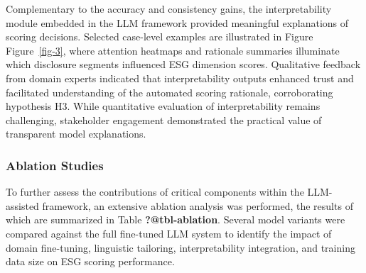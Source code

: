 \documentclass[
  12pt,
]{article}
\begin{document}
Complementary to the accuracy and consistency gains, the
interpretability module embedded in the LLM framework provided
meaningful explanations of scoring decisions. Selected case-level
examples are illustrated in Figure Figure~\ref{fig-3}, where attention
heatmaps and rationale summaries illuminate which disclosure segments
influenced ESG dimension scores. Qualitative feedback from domain
experts indicated that interpretability outputs enhanced trust and
facilitated understanding of the automated scoring rationale,
corroborating hypothesis H3. While quantitative evaluation of
interpretability remains challenging, stakeholder engagement
demonstrated the practical value of transparent model explanations.

\subsubsection{Ablation Studies}\label{ablation-studies}

To further assess the contributions of critical components within the
LLM-assisted framework, an extensive ablation analysis was performed,
the results of which are summarized in Table \textbf{?@tbl-ablation}.
Several model variants were compared against the full fine-tuned LLM
system to identify the impact of domain fine-tuning, linguistic
tailoring, interpretability integration, and training data size on ESG
scoring performance.
\end{document}
